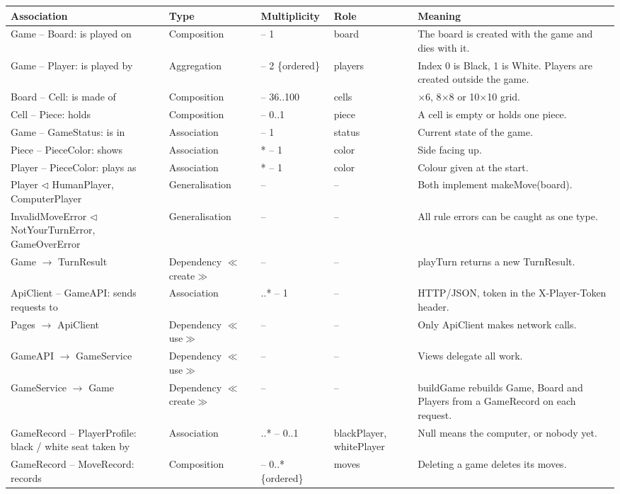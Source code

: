 \documentclass[11pt,a4paper]{article}
\begin{document}
\begin{longtable}{>{\raggedright\arraybackslash}p{3.6cm} >{\raggedright\arraybackslash}p{2.1cm} >{\raggedright\arraybackslash}p{2.2cm} >{\raggedright\arraybackslash}p{1.8cm} >{\raggedright\arraybackslash}p{4.6cm}}
\toprule
\textbf{Association} & \textbf{Type} & \textbf{Multiplicity} & \textbf{Role} & \textbf{Meaning}\\ \midrule\endhead
Game -- Board: is played on & Composition & 1 -- 1 & board & The board is created with the game and dies with it.\\
Game -- Player: is played by & Aggregation & 1 -- 2 \{ordered\} & players & Index 0 is Black, 1 is White. Players are created outside the game.\\
Board -- Cell: is made of & Composition & 1 -- 36..100 & cells & 6$\times$6, 8$\times$8 or 10$\times$10 grid.\\
Cell -- Piece: holds & Composition & 1 -- 0..1 & piece & A cell is empty or holds one piece.\\
Game -- GameStatus: is in & Association & 1 -- 1 & status & Current state of the game.\\
Piece -- PieceColor: shows & Association & * -- 1 & color & Side facing up.\\
Player -- PieceColor: plays as & Association & * -- 1 & color & Colour given at the start.\\
Player $\triangleleft$ HumanPlayer, ComputerPlayer & Generalisation & -- & -- & Both implement makeMove(board).\\
InvalidMoveError $\triangleleft$ NotYourTurnError, GameOverError & Generalisation & -- & -- & All rule errors can be caught as one type.\\
Game $\to$ TurnResult & Dependency $\ll$create$\gg$ & -- & -- & playTurn returns a new TurnResult.\\
ApiClient -- GameAPI: sends requests to & Association & 0..* -- 1 & -- & HTTP/JSON, token in the X-Player-Token header.\\
Pages $\to$ ApiClient & Dependency $\ll$use$\gg$ & -- & -- & Only ApiClient makes network calls.\\
GameAPI $\to$ GameService & Dependency $\ll$use$\gg$ & -- & -- & Views delegate all work.\\
GameService $\to$ Game & Dependency $\ll$create$\gg$ & -- & -- & buildGame rebuilds Game, Board and Players from a GameRecord on each request.\\
GameRecord -- PlayerProfile: black / white seat taken by & Association & 0..* -- 0..1 & blackPlayer, whitePlayer & Null means the computer, or nobody yet.\\
GameRecord -- MoveRecord: records & Composition & 1 -- 0..* \{ordered\} & moves & Deleting a game deletes its moves.\\
\bottomrule
\end{longtable}
\end{document}
